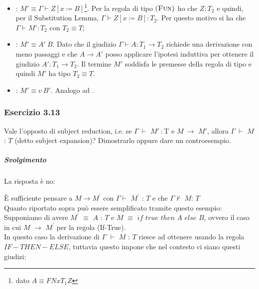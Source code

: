 \begin{description}
  \begin{itemize}
    \item {}: $M' \equiv{} \Gamma \vdash{}
      Z[x \coloneqq{} B]$\footnote{dato $A \equiv{} FN{x}{T_1}Z$}.
      Per la regola di tipo $\textsc{(Fun)}$ ho che $Z : T_2$ e quindi, per
       il Substitution Lemma, $\Gamma \vdash{} Z[x \coloneqq{} B] : T_2$. Per
      questo motivo si ha che $\Gamma \vdash{} M' : T_2$ con $T_2 \equiv T$;
    \item {}: $M' \equiv{} A'\: B$. Dato che il giudizio $\Gamma \vdash A : T_1 \to T_2$ richiede una derivazione con meno passaggi e che $A \to A'$ posso applicare l'ipotesi induttiva per ottenere il giudizio $A' : T_1 \to T_2$. Il termine $M'$ soddisfa le premesse della regola di tipo  e quindi $M'$ ha tipo $T_2 \equiv T$.

    \item {}: $M' \equiv{} v\: B'$. Analogo ad .
  \end{itemize}

 
\end{description}




\subsubsection*{Esercizio 3.13}

Vale l'opposto di subject reduction, i.e. se $\Gamma\:\vdash$ $M'\: :  $T e $M\:\rightarrow$ $M'$, allora $\Gamma\:\vdash$ $M$ : $T$ (detto subject expansion)? Dimostrarlo oppure dare un controesempio.
\subparagraph*{Svolgimento}
La risposta \`e no:

\`E sufficiente pensare a $M \rightarrow M^{\prime}$ con $\Gamma\vdash$ $M^{\prime}$ : $T$ e che 
$\Gamma\nvdash$ $M$: $T$\\
Quanto riportato sopra pu\`o essere semplificato tramite questo esempio:\\

Supponiamo di avere $M^{\prime}$ $\equiv$ $A$ : $T$ e $M$ $\equiv$ $if$ $true$ $then$ $A$ $else$ $B$, ovvero il caso in cui $M$ $\rightarrow$ $M^{\prime}$ per la regola (If-True).\\
In questo caso la derivazione di $\Gamma$ $\vdash$ $M$ : $T$ riesce ad ottenere usando la regola $IF-THEN-ELSE$, tuttavia questo impone che nel contesto ci siano questi giudizi:

